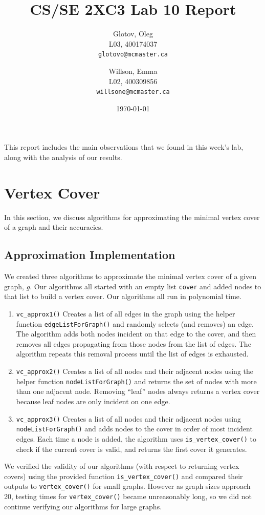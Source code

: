 \documentclass[12pt]{article}
\title{CS/SE 2XC3 Lab 10 Report}
\author{
  Glotov, Oleg\\ L03, 400174037\\
  \texttt{glotovo@mcmaster.ca}
  \and
  Willson, Emma\\ L02, 400309856\\
  \texttt{willsone@mcmaster.ca}
  }
\date{\today}
\begin{document}
\maketitle

This report includes the main observations that we found in this week's lab, along with the analysis of our results.

\newpage 
\section{Vertex Cover}
In this section, we discuss algorithms for approximating the minimal vertex cover of a graph and their accuracies. 
\subsection{Approximation Implementation}
We created three algorithms to approximate the minimal vertex cover of a given graph, $g$. Our algorithms all started with an empty list \verb+cover+ and added nodes to that list to build a vertex cover. Our algorithms all run in polynomial time.
\begin{enumerate}
\item \verb+vc_approx1()+
Creates a list of all edges in the graph using the helper function \verb+edgeListForGraph()+ and randomly selects (and removes) an edge. The algorithm adds both nodes incident on that edge to the cover, and then removes all edges propagating from those nodes from the list of edges. The algorithm repeats this removal process until the list of edges is exhausted. 
\item \verb+vc_approx2()+
Creates a list of all nodes and their adjacent nodes using the helper function \verb+nodeListForGraph()+ and returns the set of nodes with more than one adjacent node. Removing ``leaf'' nodes always returns a vertex cover because leaf nodes are only incident on one edge.
\item \verb+vc_approx3()+
Creates a list of all nodes and their adjacent nodes using \verb+nodeListForGraph()+ and adds nodes to the cover in order of most incident edges. Each time a node is added, the algorithm uses \verb+is_vertex_cover()+ to check if the current cover is valid, and returns the first cover it generates.
\end{enumerate}
We verified the validity of our algorithms (with respect to returning vertex covers) using the provided function \verb+is_vertex_cover()+ and compared their outputs to \verb+vertex_cover()+ for small graphs. However as graph sizes approach 20, testing times for \verb+vertex_cover()+ became unreasonably long, so we did not continue verifying our algorithms for large graphs. 
\end{document}
